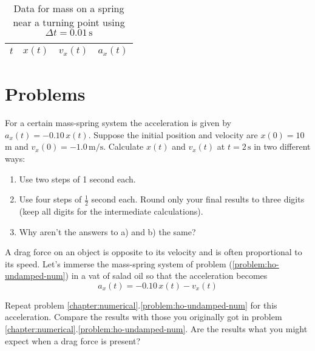 \begin{table}[!t]
\caption{Data for mass on a spring near a turning point using  
$\Delta t=0.01\, \mbox{s}$}
\begin{small}
\begin{center}
\begin{tabular}{cccc}
$t$ & $x(t)$ & $v_x(t)$ & $a_x(t)$ \\
\hline

\hline
\end{tabular}
\end{center}
\end{small}
\label{table:numerical2}
\end{table}

\onecolumn 
\addtolength{\textheight}{-.5in} 
\addtolength{\footskip}{2.in}




\newpage

\section*{Problems}

\begin{problem}
  For a certain mass-spring system the acceleration is given by $a_x(t) =
  -0.10\, x(t)$.  Suppose the initial position and velocity are $x(0)
  = 10$ m and $v_x(0) = -1.0\, \mbox{m/s}$.  Calculate $x(t)$ and $v_x(t)$
  at $t = 2\, \mbox{s}$ in two different ways:
  \begin{enumerate}
  \item Use two steps of 1 second each.
  \item Use four steps of $\frac{1}{2}$ second each.  Round only your
    final results to three digits (keep all digits for the
    intermediate calculations).
  \item Why aren't the answers to a) and b) the same?
  \end{enumerate}
  \label{problem:ho-undamped-num}
\end{problem}


\begin{problem}
  A drag force on an object is opposite to its velocity and is often
  proportional to its speed.  Let's immerse the mass-spring system of
  problem (\ref{problem:ho-undamped-num}) in a vat of salad oil so
  that the acceleration becomes
  \[a_x(t) = -0.10\, x(t) - v_x(t)\] 

  Repeat problem \ref{chapter:numerical}.\ref{problem:ho-undamped-num}
  for this acceleration.  Compare the results with those you
  originally got in problem
  \ref{chapter:numerical}.\ref{problem:ho-undamped-num}.  Are the
  results what you might expect when a drag force is present?
\end{problem}
